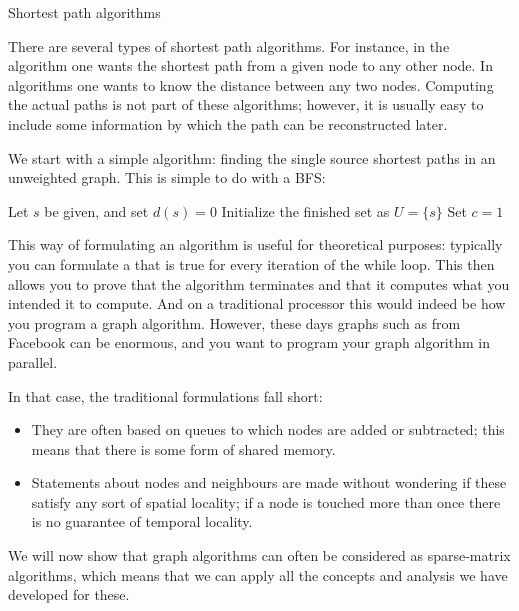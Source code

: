  {Shortest path algorithms}

There are several types of shortest path algorithms. For instance,
in the  algorithm
one wants the shortest path from a given node to any other node.
In  algorithms
one wants to know the distance between any two nodes.
Computing the actual paths is not part of these algorithms; 
however, it is usually easy to include some information by
which the path can be reconstructed later.

We start with a simple algorithm: finding the single source shortest
paths in an unweighted graph. This is simple to do with a \acf{BFS}:

\begin{displayalgorithm}
  Let $s$ be given, and set $d(s)=0$\;
  Initialize the finished set as $U=\{s\}$\;
  Set $c=1$\;
\end{displayalgorithm}

This way of formulating an algorithm is useful for theoretical purposes:
typically you can formulate a  that is true
for every iteration of the while loop. This then allows you to prove
that the algorithm terminates and that it computes what you intended it to compute.
And on a traditional processor this would indeed be how you program 
a graph algorithm. However, these days graphs such as from Facebook 
can be enormous, and you want to program your graph algorithm in parallel.

In that case, the traditional formulations fall short:
\begin{itemize}
\item They are often based on queues to which nodes are added or subtracted; this means
  that there is some form of shared memory.
\item Statements about nodes and neighbours are made without wondering if these
  satisfy any sort of spatial locality; if a node is touched more than once there is
  no guarantee of temporal locality.
\end{itemize}
We will now show that graph algorithms can often be considered as sparse-matrix
algorithms, which means that we can apply all the concepts and analysis we have developed for these.

